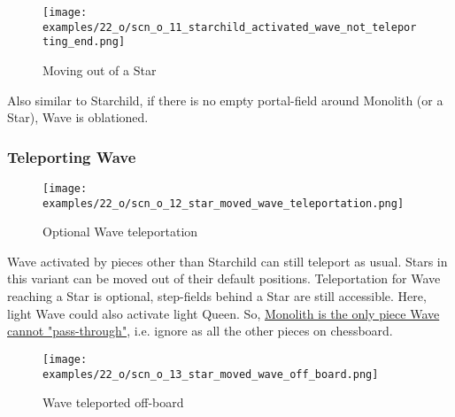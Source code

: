 \vspace*{5.1\baselineskip}
\noindent
\begin{wrapfigure}[5]{l}{0.4\textwidth}
\centering
\texttt{[image: examples/22\_o/scn\_o\_11\_starchild\_activated\_wave\_not\_teleporting\_end.png]}
\caption{Moving out of a Star}
\label{fig:scn_o_11_starchild_activated_wave_not_teleporting_end}
\end{wrapfigure}
Also similar to Starchild, if there is no empty portal-field around Monolith (or a Star), Wave
is oblationed.

\clearpage %

\subsubsection*{Teleporting Wave}

\vspace*{-0.9\baselineskip}
\noindent
\begin{figure}[!h]
\texttt{[image: examples/22\_o/scn\_o\_12\_star\_moved\_wave\_teleportation.png]}
\caption{Optional Wave teleportation}
\label{fig:scn_o_12_star_moved_wave_teleportation}
\end{figure}

\vspace*{-0.3\baselineskip}
Wave activated by pieces other than Starchild can still teleport as usual. Stars in this variant
can be moved out of their default positions. Teleportation for Wave reaching a Star is optional,
step-fields behind a Star are still accessible. Here, light Wave could also activate light Queen. So,
\hyperref[fig:scn_d_09_teleport_wave_via_monolith]{Monolith is the only piece Wave cannot "pass-through"},
i.e. ignore as all the other pieces on chessboard.

\clearpage %

\vspace*{-2.1\baselineskip}
\noindent
\begin{figure}[!h]
\texttt{[image: examples/22\_o/scn\_o\_13\_star\_moved\_wave\_off\_board.png]}
\caption{Wave teleported off-board}
\label{fig:scn_o_13_star_moved_wave_off_board}
\end{figure}

